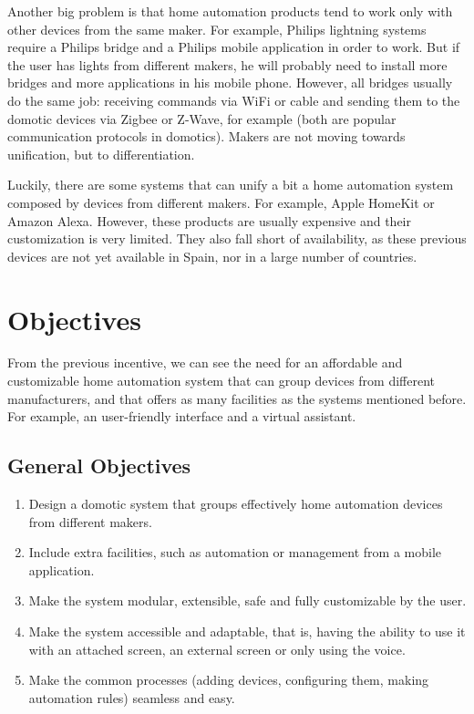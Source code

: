 Another big problem is that home automation products tend to work only with other devices from the same maker. For example, Philips
lightning systems require a Philips bridge and a Philips mobile application in order to work. But if the user has lights from different
makers, he will probably need to install more bridges and more applications in his mobile phone. However, all bridges usually do the same
job: receiving commands via WiFi or cable and sending them to the domotic devices via Zigbee or Z-Wave, for example (both are popular
communication protocols in domotics). Makers are not moving towards unification, but to differentiation.

Luckily, there are some systems that can unify a bit a home automation system composed by devices from different makers. For example,
Apple HomeKit or Amazon Alexa. However, these products are usually expensive and their customization is very limited. They also fall short
of availability, as these previous devices are not yet available in Spain, nor in a large number of countries.

\section{Objectives}
From the previous incentive, we can see the need for an affordable and customizable home automation system that can group devices
from different manufacturers, and that offers as many facilities as the systems mentioned before. For example, an user-friendly
interface and a virtual assistant.

\subsection{General Objectives}
\begin{enumerate}
	\item Design a domotic system that groups effectively home automation devices from different makers.
	\item Include extra facilities, such as automation or management from a mobile application.
	\item Make the system modular, extensible, safe and fully customizable by the user.
	\item Make the system accessible and adaptable, that is, having the ability to use it with an attached screen, an external
	screen or only using the voice.
	\item Make the common processes (adding devices, configuring them, making automation rules) seamless and easy.
\end{enumerate}

